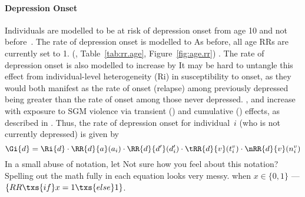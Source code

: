 \paragraph{Depression Onset}
Individuals are modelled to be at risk of depression onset
from age 10 and not before~\cite{Solmi2022}.
The rate of depression onset is modelled to
     {As before, all age RRs are currently set to 1.}
(, Table~\ref{tab:rr.age}, Figure~\ref{fig:age.rr})
\cite{Patten2010,Hankin2015,Solmi2022}.
The rate of depression onset is also modelled to increase
by 
     {It may be hard to untangle this effect from
      individual-level heterogeneity (Ri) in susceptibility to onset,
      as they would both manifest as
      the rate of onset (relapse) among previously depressed being greater than
      the rate of onset among those never depressed.}
\cite{Kendler2010},
and increase with exposure to SGM violence
via transient () and cumulative () effects,
as described in .
Thus, the rate of depression onset for individual~$i$
(who is not currently depressed) is given by
\begin{equation}
  \Gi{d} = \Ri{d}
     \cdot \RR{d}{a}(a_i)
     \cdot \RR{d}{d'}(d'_i)
     \cdot \tRR{d}{v}(t^v_i)
     \cdot \nRR{d}{v}(n^v_i)
\end{equation}
In a small abuse of notation, let
     {Not sure how you feel about this notation?
      Spelling out the math fully in each equation looks very messy.}
when $x \in \{0,1\}$
--- \ie $\{RR\txs{if}x=1\txs{else}1\}$.
